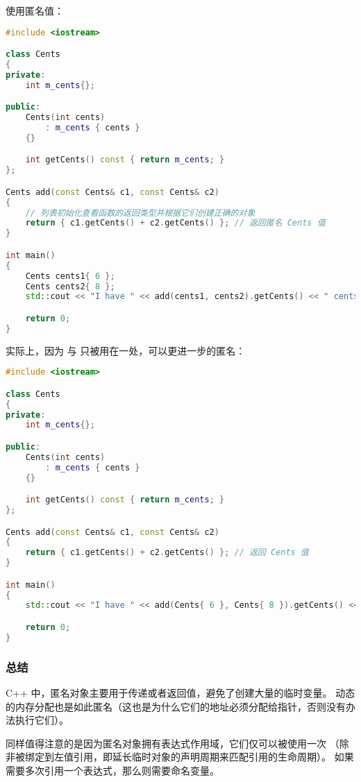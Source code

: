 \documentclass[../../LearnCpp.tex]{subfiles}
\begin{document}
使用匿名值：

\begin{lstlisting}[language=C++]
#include <iostream>

class Cents
{
private:
    int m_cents{};

public:
    Cents(int cents)
        : m_cents { cents }
    {}

    int getCents() const { return m_cents; }
};

Cents add(const Cents& c1, const Cents& c2)
{
    // 列表初始化查看函数的返回类型并根据它们创建正确的对象
    return { c1.getCents() + c2.getCents() }; // 返回匿名 Cents 值
}

int main()
{
    Cents cents1{ 6 };
    Cents cents2{ 8 };
    std::cout << "I have " << add(cents1, cents2).getCents() << " cents.\n";

    return 0;
}
\end{lstlisting}

实际上，因为  与  只被用在一处，可以更进一步的匿名：

\begin{lstlisting}[language=C++]
#include <iostream>

class Cents
{
private:
    int m_cents{};

public:
    Cents(int cents)
        : m_cents { cents }
    {}

    int getCents() const { return m_cents; }
};

Cents add(const Cents& c1, const Cents& c2)
{
    return { c1.getCents() + c2.getCents() }; // 返回 Cents 值
}

int main()
{
    std::cout << "I have " << add(Cents{ 6 }, Cents{ 8 }).getCents() << " cents.\n"; // 打印 Cents 值

    return 0;
}
\end{lstlisting}

\subsubsection*{总结}

C++ 中，匿名对象主要用于传递或者返回值，避免了创建大量的临时变量。
动态的内存分配也是如此匿名（这也是为什么它们的地址必须分配给指针，否则没有办法执行它们）。

同样值得注意的是因为匿名对象拥有表达式作用域，它们仅可以被使用一次
（除非被绑定到左值引用，即延长临时对象的声明周期来匹配引用的生命周期）。
如果需要多次引用一个表达式，那么则需要命名变量。
\end{document}
